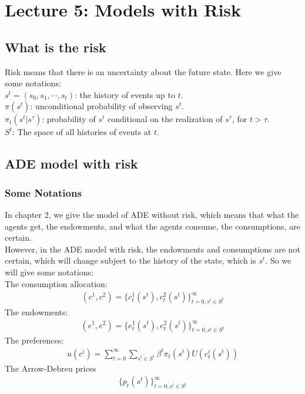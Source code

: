 \documentclass{article}
\begin{document}
\newpage
\section{Lecture 5: Models with Risk}%
\subsection{What is the risk}
Risk means that there is an uncertainty about the future state. Here we give some notations:\\
\indent $s^t = (s_0, s_1, \cdots, s_t)$: the history of events up to $t$.\\
\indent $\pi(s^t)$: unconditional probability of observing $s^t$.\\
\indent $\pi_t(s^t | s^\tau)$: probability of $s^t$ conditional on the realization of $s^\tau$, for $t > \tau$.\\
\indent $S^t$: The space of all histories of events at $t$.


\subsection{ADE model with risk}
\subsubsection{Some Notations}
In chapter 2, we give the model of ADE without risk, which means that what the agents get, the endowments, and what the agents consume, the consumptions, are certain.\\
However, in the ADE model with risk, the endowments and consumptions are not certain, which will change subject to the history of the state, which is $s^t$. So we will give some notations:\\
\indent The consumption allocation:
\begin{align*}
	(c^1, c^2) = \{c^1_t (s^t), c^2_t (s^t)\}^\infty_{t=0, s^t \in S^t}
\end{align*}
\indent The endowments:
\begin{align*}
	(e^1, e^2) = \{e^1_t (s^t), e^2_t (s^t)\}^\infty_{t=0, s^t \in S^t}
\end{align*}
\indent The preferences:
\begin{align*}
	u(c^i) = \sum\limits^\infty_{t=0} \sum\limits_{s^t \in S^t} \beta^t \pi_t(s^t) U(c^i_t(s^t))
\end{align*}
\indent The Arrow-Debreu prices
\begin{align*}
	\{p_t(s^t)\}^\infty_{t=0, s^t \in S^t}
\end{align*}
\end{document}

